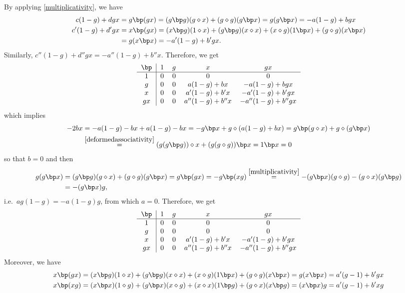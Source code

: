 \documentclass[10pt]{article}
\theoremstyle{definition}
\renewcommand{\wp}{\diamond}
\begin{document}
By applying \eqref{multiplicativity}, we have
\begin{align*}
    c(1-g)+dgx&=g\bp(gx)=
    (g\bp g)(g\wp x)+(g\wp g)(g\bp x)=g(g\bp x)=-a(1-g)+bgx\\ 
    c'(1-g)+d'gx&=x\bp(gx)=
    (x\bp g)(1\wp x)+(g\bp g)(x\wp x)+(x\wp g)(1\bp x)+(g\wp g)(x\bp x)\\&=g(x\bp x)=-a'(1-g)+b'gx.
\end{align*}
Similarly, $c''(1-g)+d''gx=-a''(1-g)+b''x$.
Therefore, we get
\[
\begin{tabular}{c|cccc}
    $\bp$& $1$ & $g$ & $x$ & $gx$\\ \hline
    $1$ & $0$ & $0$ & $0$ & $0$ \\ 
    $g$ & $0$ & $0$ & $a(1-g)+bx$ & $-a(1-g)+bgx$ \\ 
    $x$ & $0$ & $0$ & $a'(1-g)+b'x$ & $-a'(1-g)+b'gx$ \\ 
    $gx$ & $0$ & $0$ & $a''(1-g)+b''x$ & $-a''(1-g)+b''gx$ \\ 
\end{tabular}
\]
which implies
\[
\begin{split}
-2bx&=-a(1-g)-bx+a(1-g)-bx=-g\bp x+g\wp(a(1-g)+bx)=
g\bp(g\wp x)+g\wp(g\bp x)\\&\overset{\eqref{deformedassociativity}}{=} (g(g\bp g))\wp x+(g(g\wp g))\bp x=1\bp x=0
\end{split}
\]
so that $b=0$ and then 
\[
\begin{split}
g(g\bp x)&=(g\bp g)(g\wp x)+(g\wp g)(g\bp x)=g\bp(gx)=-g\bp(xg)\overset{\eqref{multiplicativity}}{=}-(g\bp x)(g\wp g)-(g\wp x)(g\bp g)\\&=-(g\bp x)g,
\end{split}
\]
i.e.\ $ag(1-g)=-a(1-g)g$, from which $a=0$. Therefore, we get
\[
\begin{tabular}{c|cccc}
    $\bp$& $1$ & $g$ & $x$ & $gx$\\ \hline
    $1$ & $0$ & $0$ & $0$ & $0$ \\ 
    $g$ & $0$ & $0$ & $0$ & $0$ \\ 
    $x$ & $0$ & $0$ & $a'(1-g)+b'x$ & $-a'(1-g)+b'gx$ \\ 
    $gx$ & $0$ & $0$ & $a''(1-g)+b''x$ & $-a''(1-g)+b''gx$\\ 
\end{tabular}
\]
Moreover, we have
\begin{align*}
x\bp(gx)&=(x\bp g)(1\wp x)+(g\bp g)(x\wp x)+(x\wp g)(1\bp x)+(g\wp g)(x\bp x)=g(x\bp x)=a'(g-1)+b'gx\\
x\bp(xg)&=(x\bp x)(1\wp g)+(g\bp x)(x\wp g)+(x\wp x)(1\bp g)+(g\wp x)(x\bp g)=(x\bp x)g=a'(g-1)+b'xg
\end{align*}
\end{document}
